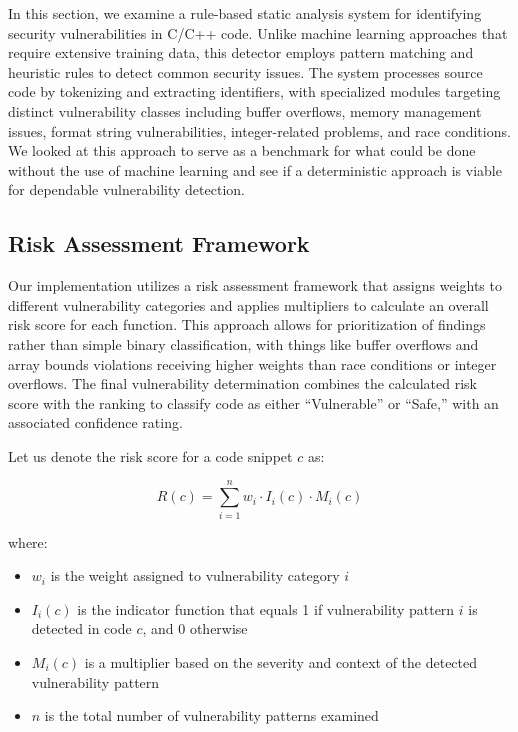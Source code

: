 \documentclass{article}
\begin{document}
In this section, we examine a rule-based static analysis system for identifying security vulnerabilities in C/C++ code. Unlike machine learning approaches that require extensive training data, this detector employs pattern matching and heuristic rules to detect common security issues. The system processes source code by tokenizing and extracting identifiers, with specialized modules targeting distinct vulnerability classes including buffer overflows, memory management issues, format string vulnerabilities, integer-related problems, and race conditions. We looked at this approach to serve as a benchmark for what could be done without the use of machine learning and see if a deterministic approach is viable for dependable vulnerability detection.

\subsection{Risk Assessment Framework}

Our implementation utilizes a risk assessment framework that assigns weights to different vulnerability categories and applies multipliers to calculate an overall risk score for each function. This approach allows for prioritization of findings rather than simple binary classification, with things like buffer overflows and array bounds violations receiving higher weights than race conditions or integer overflows. The final vulnerability determination combines the calculated risk score with the ranking to classify code as either ``Vulnerable'' or ``Safe,'' with an associated confidence rating.

Let us denote the risk score for a code snippet $c$ as:

\begin{equation}
    R(c) = \sum_{i=1}^{n} w_i \cdot I_i(c) \cdot M_i(c)
\end{equation}

where:
\begin{itemize}
    \item $w_i$ is the weight assigned to vulnerability category $i$
    \item $I_i(c)$ is the indicator function that equals 1 if vulnerability pattern $i$ is detected in code $c$, and 0 otherwise
    \item $M_i(c)$ is a multiplier based on the severity and context of the detected vulnerability pattern
    \item $n$ is the total number of vulnerability patterns examined
\end{itemize}
\end{document}
